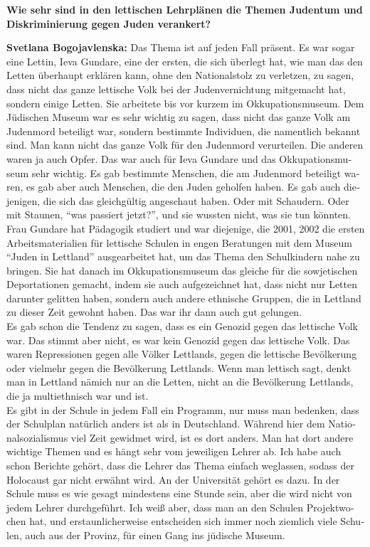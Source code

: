 \begin{otherlanguage}{ngerman}
\textbf{Wie sehr sind in den lettischen Lehrplänen die Themen Judentum und Diskriminierung gegen Juden verankert?}

\textbf{Svetlana Bogojavlenska:} Das Thema ist auf jeden Fall präsent. Es war sogar eine Lettin, Ieva Gundare, eine der ersten, die sich überlegt hat, wie man das den Letten überhaupt erklären kann, ohne den Nationalstolz zu verletzen, zu sagen, dass nicht das ganze lettische Volk bei der Judenvernichtung mitgemacht hat, sondern einige Letten. Sie arbeitete bis vor kurzem im Okkupationsmuseum. Dem Jüdischen Museum war es sehr wichtig zu sagen, dass nicht das ganze Volk am Judenmord beteiligt war, sondern bestimmte Individuen, die namentlich bekannt sind. Man kann nicht das ganze Volk für den Judenmord verurteilen. Die anderen waren ja auch Opfer. Das war auch für Ieva Gundare und das Okkupationsmuseum sehr wichtig. Es gab bestimmte Menschen, die am Judenmord beteiligt waren, es gab aber auch Menschen, die den Juden geholfen haben. Es gab auch diejenigen, die sich das gleichgültig angeschaut haben. Oder mit Schaudern. Oder mit Staunen, "`was passiert jetzt?"', und sie wussten nicht, was sie tun könnten.\\ 
Frau Gundare hat Pädagogik studiert und war diejenige, die 2001, 2002 die ersten Arbeitsmaterialien für lettische Schulen in engen Beratungen mit dem Museum "`Juden in Lettland"' ausgearbeitet hat, um das Thema den Schulkindern nahe zu bringen. Sie hat danach im Okkupationsmuseum das gleiche für die sowjetischen Deportationen gemacht, indem sie auch aufgezeichnet hat, dass nicht nur Letten darunter gelitten haben, sondern auch andere ethnische Gruppen, die in Lettland zu dieser Zeit gewohnt haben. Das war ihr dann auch gut gelungen.\\
Es gab schon die Tendenz zu sagen, dass es ein Genozid gegen das lettische Volk war. Das stimmt aber nicht, es war kein Genozid gegen das lettische Volk. Das waren Repressionen gegen alle Völker Lettlands, gegen die lettische Bevölkerung oder vielmehr gegen die Bevölkerung Lettlands. Wenn man lettisch sagt, denkt man in Lettland nämich nur an die Letten, nicht an die Bevölkerung Lettlands, die ja multiethnisch war und ist.\\
Es gibt in der Schule in jedem Fall ein Programm, nur muss man bedenken, dass der Schulplan natürlich anders ist als in Deutschland. Während hier dem Nationalsozialismus viel Zeit gewidmet wird, ist es dort anders. Man hat dort andere wichtige Themen und es hängt sehr vom jeweiligen Lehrer ab. Ich habe auch schon Berichte gehört, dass die Lehrer das Thema einfach weglassen, sodass der Holocaust gar nicht erwähnt wird. An der Universität gehört es dazu. In der Schule muss es wie gesagt mindestens eine Stunde sein, aber die wird nicht von jedem Lehrer durchgeführt. Ich weiß aber, dass man an den Schulen Projektwochen hat, und erstaunlicherweise entscheiden sich immer noch ziemlich viele Schulen, auch aus der Provinz, für einen Gang ins jüdische Museum.
\end{otherlanguage}
